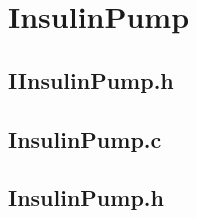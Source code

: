 \chapter{InsulinPump}

\section{IInsulinPump.h}



\section{InsulinPump.c}


	
	
\section{InsulinPump.h}


	
